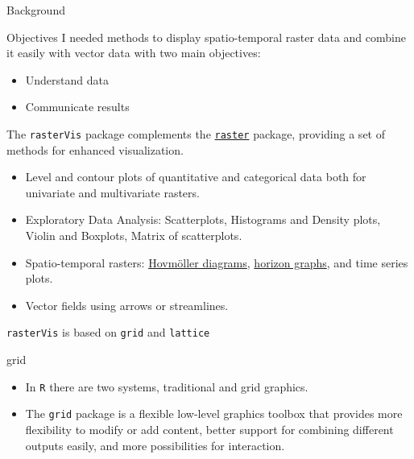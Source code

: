 \documentclass[xcolor={usenames,svgnames,dvipsnames}]{beamer}
\begin{document}
\begin{frame}[label=sec-3]{Background}
\begin{block}{Objectives}
I needed methods to display spatio-temporal raster data and combine it
easily with vector data with \alert{two main objectives}:
\begin{itemize}
\item Understand data
\item Communicate results
\end{itemize}
\end{block}
\end{frame}
\begin{frame}[fragile,label=sec-4]{}
 \begin{block}{The \alert{\texttt{rasterVis}} package complements the \href{http://cran.r-project.org/web/packages/raster}{\texttt{raster}} package, providing a set of methods for enhanced visualization.}
\begin{itemize}
\item \alert{Level and contour plots} of quantitative and categorical data both
for univariate and multivariate rasters.
\item \alert{Exploratory Data Analysis}: Scatterplots, Histograms and Density
plots, Violin and Boxplots, Matrix of scatterplots.
\item \alert{Spatio-temporal rasters}: \href{http://en.wikipedia.org/wiki/Hovm%25C3%25B6ller_diagram}{Hovmöller diagrams}, \href{http://www.perceptualedge.com/blog/?p%3D390}{horizon
graphs}, and time series plots.
\item \alert{Vector fields} using arrows or streamlines.
\end{itemize}
\end{block}
\end{frame}
\begin{frame}[fragile,label=sec-5]{\texttt{rasterVis} is based on \texttt{grid} and \texttt{lattice}}
 \begin{block}{grid}
\begin{itemize}
\item In \texttt{R} there are two systems, traditional and grid graphics.
\item The \texttt{grid} package is a flexible low-level graphics toolbox that
provides more flexibility to modify or add content, better support
for combining different outputs easily, and more possibilities for
interaction.
\end{itemize}
\end{block}
\end{frame}
\end{document}
